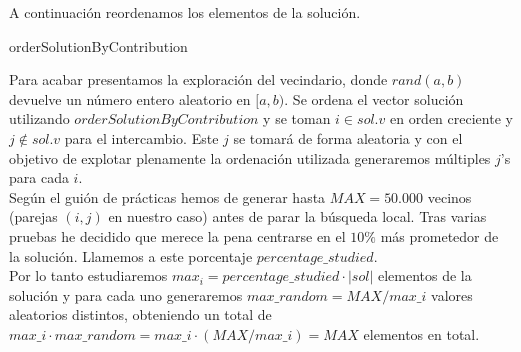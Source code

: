 \documentclass[11pt,a4paper]{article}
\begin{document}
	A continuación reordenamos los elementos de la solución. \\

	\begin{algorithm}[H]
		\caption{orderSolutionByContribution}
	\end{algorithm}

	Para acabar presentamos la exploración del vecindario, donde $rand(a,b)$ devuelve un número entero aleatorio en $[a,b)$. Se ordena el vector solución utilizando $orderSolutionByContribution$ y se toman $i \in sol.v$ en orden creciente y $j \notin sol.v$ para el intercambio. Este $j$ se tomará de forma aleatoria y con el objetivo de explotar plenamente la ordenación utilizada generaremos múltiples $j$'s para cada $i$. \\
	
	Según el guión de prácticas hemos de generar hasta $MAX = 50.000$ vecinos (parejas $(i,j)$ en nuestro caso) antes de parar la búsqueda local. Tras varias pruebas he decidido que merece la pena centrarse en el $10\%$ más prometedor de la solución. Llamemos a este porcentaje $percentage\_studied$. \\
	
	Por lo tanto estudiaremos $max_i = percentage\_studied \cdot |sol|$ elementos de la solución y para cada uno generaremos $max\_random = MAX / max\_i$ valores aleatorios distintos, obteniendo un total de $ max\_i \cdot max\_random = max\_i \cdot (MAX / max\_i) = MAX$ elementos en total. \\
\end{document}
